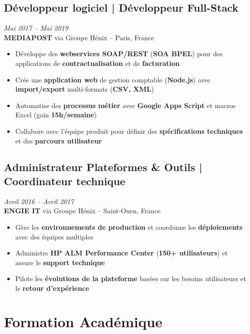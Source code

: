 \documentclass[11pt,a4paper]{article}
\newcommand{\highlight}[1]{\textcolor{primaryblue}{\textbf{#1}}}
\newcommand{\keypoint}[1]{\textbf{#1}}
\begin{document}
\subsection*{Développeur logiciel | Développeur Full-Stack} \hfill \textit{\color{mediumgray}Mai 2017 -- Mai 2019}\\
\textcolor{primaryblue}{\textbf{MEDIAPOST}} via Groupe Hénix -- Paris, France
\begin{itemize}[leftmargin=22pt]
    \item Développe des \highlight{webservices SOAP/REST} (\highlight{SOA BPEL}) pour des applications de \highlight{contractualisation} et de \highlight{facturation}
    \item Crée une \highlight{application web} de gestion comptable (\highlight{Node.js}) avec \highlight{import/export} multi-formats (\highlight{CSV, XML})
    \item Automatise des \highlight{processus métier} avec \highlight{Google Apps Script} et macros Excel (gain \keypoint{15h/semaine})
    \item Collabore avec l'équipe produit pour définir des \highlight{spécifications techniques} et des \highlight{parcours utilisateur}
\end{itemize}

\subsection*{Administrateur Plateformes \& Outils | Coordinateur technique} \hfill \textit{\color{mediumgray}Avril 2016 -- Avril 2017}\\
\textcolor{primaryblue}{\textbf{ENGIE IT}} via Groupe Hénix -- Saint-Ouen, France
\begin{itemize}[leftmargin=22pt]
    \item Gère les \highlight{environnements de production} et coordonne les \highlight{déploiements} avec des équipes multiples
    \item Administre \highlight{HP ALM Performance Center} (\keypoint{150+ utilisateurs}) et assure le \highlight{support technique}
    \item Pilote les \highlight{évolutions de la plateforme} basées sur les besoins utilisateurs et le \highlight{retour d'expérience}
\end{itemize}

\section*{Formation Académique}
\end{document}
